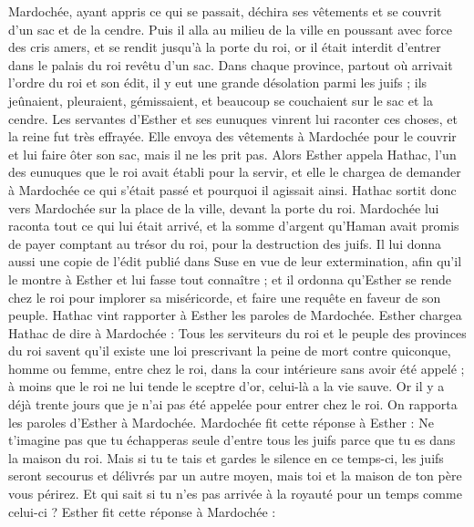 \begin{multicols}{2}
\VerseOne{}Mardochée, ayant appris ce qui se passait, déchira ses vêtements et se couvrit d'un sac et de la cendre. Puis il alla au milieu de la ville en poussant avec force des cris amers,
et se rendit jusqu'à la porte du roi, or il était interdit d'entrer dans le palais du roi revêtu d'un sac.
Dans chaque province, partout où arrivait l’ordre du roi et son édit, il y eut une grande désolation parmi les juifs ; ils jeûnaient, pleuraient, gémissaient, et beaucoup se couchaient sur le sac et la cendre.
Les servantes d'Esther et ses eunuques vinrent lui raconter ces choses, et la reine fut très effrayée. Elle envoya des vêtements à Mardochée pour le couvrir et lui faire ôter son sac, mais il ne les prit pas.
Alors Esther appela Hathac, l'un des eunuques que le roi avait établi pour la servir, et elle le chargea de demander à Mardochée ce qui s’était passé et pourquoi il agissait ainsi.
Hathac sortit donc vers Mardochée sur la place de la ville, devant la porte du roi.
Mardochée lui raconta tout ce qui lui était arrivé, et la somme d'argent qu'Haman avait promis de payer comptant au trésor du roi, pour la destruction des juifs.
Il lui donna aussi une copie de l'édit publié dans Suse en vue de leur extermination, afin qu’il le montre à Esther et lui fasse tout connaître ; et il ordonna qu’Esther se rende chez le roi pour implorer sa miséricorde, et faire une requête en faveur de son peuple.
Hathac vint rapporter à Esther les paroles de Mardochée.
Esther chargea Hathac de dire à Mardochée :
Tous les serviteurs du roi et le peuple des provinces du roi savent qu'il existe une loi prescrivant la peine de mort contre quiconque, homme ou femme, entre chez le roi, dans la cour intérieure sans avoir été appelé ; à moins que le roi ne lui tende le sceptre d'or, celui-là a la vie sauve. Or il y a déjà trente jours que je n'ai pas été appelée pour entrer chez le roi.
On rapporta les paroles d'Esther à Mardochée.
Mardochée fit cette réponse à Esther : Ne t’imagine pas que tu échapperas seule d'entre tous les juifs parce que tu es dans la maison du roi.
Mais si tu te tais et gardes le silence en ce temps-ci, les juifs seront secourus et délivrés par un autre moyen, mais toi et la maison de ton père vous périrez. Et qui sait si tu n'es pas arrivée à la royauté pour un temps comme celui-ci ?
Esther fit cette réponse à Mardochée :

\end{multicols}
